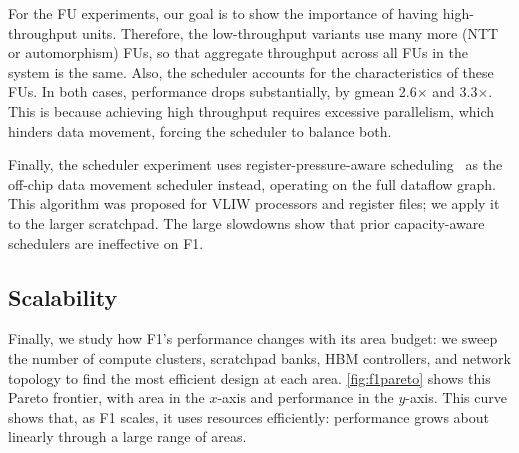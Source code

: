 For the FU experiments, our goal is to show the importance of having
high-throughput units. Therefore, the low-throughput variants use many more
(NTT or automorphism) FUs, so that aggregate throughput across all FUs in the
system is the same. Also, the scheduler accounts for the characteristics of
these FUs. In both cases, performance drops substantially, by gmean 2.6$\times$
and 3.3$\times$. This is because achieving high throughput requires excessive
parallelism, which hinders data movement, forcing the scheduler to balance
both.

Finally, the scheduler experiment uses register-pressure-aware
scheduling~\cite{goodman:ics1988:code} as the off-chip data movement scheduler
instead, operating on the full dataflow graph. This algorithm was proposed for
VLIW processors and register files; we apply it to the larger scratchpad. The
large slowdowns show that prior capacity-aware schedulers are ineffective on
F1.

\figFOneConfigs

\subsection{Scalability}
\label{sec:scalability}

Finally, we study how F1's performance changes with its area budget: we sweep
the number of compute clusters, scratchpad banks, HBM controllers, and network
topology to find the most efficient design at each area. \autoref{fig:f1pareto}
shows this Pareto frontier, with area in the $x$-axis and performance in the
$y$-axis. This curve shows that, as F1 scales, it uses resources efficiently:
performance grows about linearly through a large range of areas.
